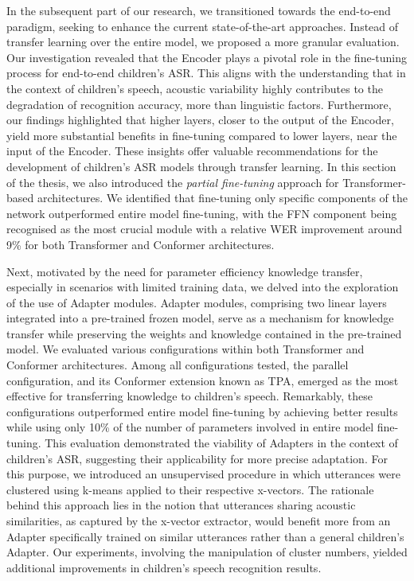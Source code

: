 In the subsequent part of our research, we transitioned towards the end-to-end paradigm, seeking to enhance the current state-of-the-art approaches. Instead of transfer learning over the entire model, we proposed a more granular evaluation. Our investigation revealed that the Encoder plays a pivotal role in the fine-tuning process for end-to-end children's \ac{ASR}. This aligns with the understanding that in the context of children's speech, acoustic variability highly contributes to the degradation of recognition accuracy, more than linguistic factors. Furthermore, our findings highlighted that higher layers, closer to the output of the Encoder, yield more substantial benefits in fine-tuning compared to lower layers, near the input of the Encoder. These insights offer valuable recommendations for the development of children's \ac{ASR} models through transfer learning. In this section of the thesis, we also introduced the \textit{partial fine-tuning} approach for Transformer-based architectures. We identified that fine-tuning only specific components of the network outperformed entire model fine-tuning, with the \ac{FFN} component being recognised as the most crucial module with a relative \ac{WER} improvement around 9\% for both Transformer and Conformer architectures.

Next, motivated by the need for parameter efficiency knowledge transfer, especially in scenarios with limited training data, we delved into the exploration of the use of Adapter modules. Adapter modules, comprising two linear layers integrated into a pre-trained frozen model, serve as a mechanism for knowledge transfer while preserving the weights and knowledge contained in the pre-trained model. We evaluated various configurations within both Transformer and Conformer architectures. Among all configurations tested, the parallel configuration, and its Conformer extension known as \ac{TPA}, emerged as the most effective for transferring knowledge to children's speech. Remarkably, these configurations outperformed entire model fine-tuning by achieving better results while using only 10\% of the number of parameters involved in entire model fine-tuning. This evaluation demonstrated the viability of Adapters in the context of children's \ac{ASR}, suggesting their applicability for more precise adaptation. For this purpose, we introduced an unsupervised procedure in which utterances were clustered using k-means applied to their respective x-vectors. The rationale behind this approach lies in the notion that utterances sharing acoustic similarities, as captured by the x-vector extractor, would benefit more from an Adapter specifically trained on similar utterances rather than a general children's Adapter. Our experiments, involving the manipulation of cluster numbers, yielded additional improvements in children's speech recognition results.


